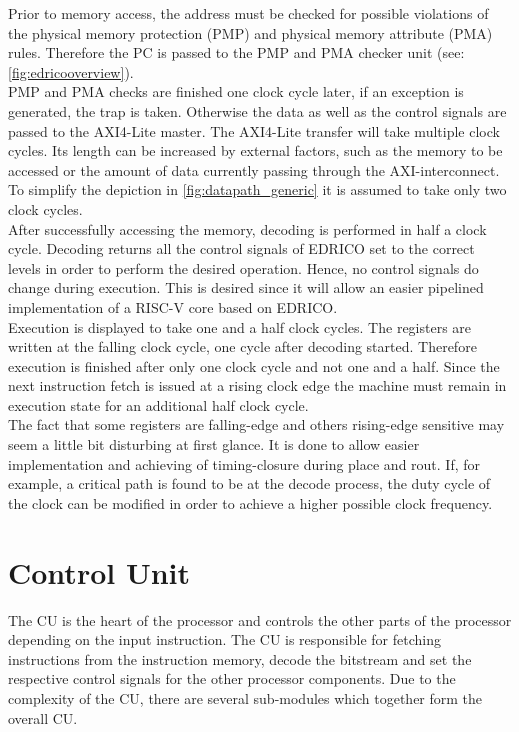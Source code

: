 Prior to memory access, the address must be checked for possible violations of the physical memory protection (PMP) and physical memory attribute (PMA) rules. Therefore the PC is passed to the PMP and PMA checker unit (see: \ref{fig:edricooverview}).\\
PMP and PMA checks are finished one clock cycle later, if an exception is generated, the trap is taken. Otherwise the data as well as the control signals are passed to the AXI4-Lite master.
The AXI4-Lite transfer will take multiple clock cycles. Its length can be increased by external factors, such as the memory to be accessed or the amount of data currently passing through the AXI-interconnect. To simplify the depiction in \ref{fig:datapath_generic} it is assumed to take only two clock cycles.\\
After successfully accessing the memory, decoding is performed in half a clock cycle. Decoding returns all the control signals of EDRICO set to the correct levels in order to perform the desired operation. Hence, no control signals do change during execution. This is desired since it will allow an easier pipelined implementation of a RISC-V core based on EDRICO.\\
Execution is displayed to take one and a half clock cycles. The registers are written at the falling clock cycle, one cycle after decoding started. Therefore execution is finished after only one clock cycle and not one and a half. Since the next instruction fetch is issued at a rising clock edge the machine must remain in execution state for an additional half clock cycle. \\
The fact that some registers are falling-edge and others rising-edge sensitive may seem a little bit disturbing at first glance. It is done to allow easier implementation and achieving of timing-closure during place and rout. If, for example, a critical path is found to be at the decode process, the duty cycle of the clock can be modified in order to achieve a higher possible clock frequency.

\clearpage
\section{Control Unit}
The \ac{CU} is the heart of the processor and controls the other parts of the processor depending on the input instruction. The CU is responsible for fetching instructions from the instruction memory, decode the bitstream and set the respective control signals for the other processor components. Due to the complexity of the CU, there are several sub-modules which together form the overall CU.
